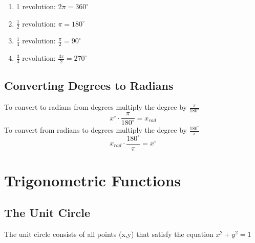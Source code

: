 \documentclass{article}
\begin{document}
\begin{enumerate}
  \item 1 revolution: 
    $2\pi = 360^{\circ}$

  \item $\frac{1}{2}$ revolution:
    $\pi = 180^{\circ}$

  \item $\frac{1}{4}$ revolution:
    $\frac{\pi}{2} = 90^{\circ}$

  \item $\frac{3}{4}$ revolution:
    $\frac{3\pi}{2} = 270^{\circ}$
\end{enumerate}

\subsection{Converting Degrees to Radians}
To convert to radians from degrees multiply the degree by
$\frac{\pi}{180^{\circ}}$
\[x^{\circ} \cdot \frac{\pi}{180^{\circ}} = x_{rad}\]
To convert from radians to degrees multiply the degree by
$\frac{180^{\circ}}{\pi}$ \[x_{rad} \cdot \frac{180^{\circ}}{\pi}=x^{\circ}\]


\section{Trigonometric Functions}
\subsection{The Unit Circle}
The unit circle consists of all points (x,y) that satisfy the equation $x^2
+ y^2 = 1$
\end{document}
